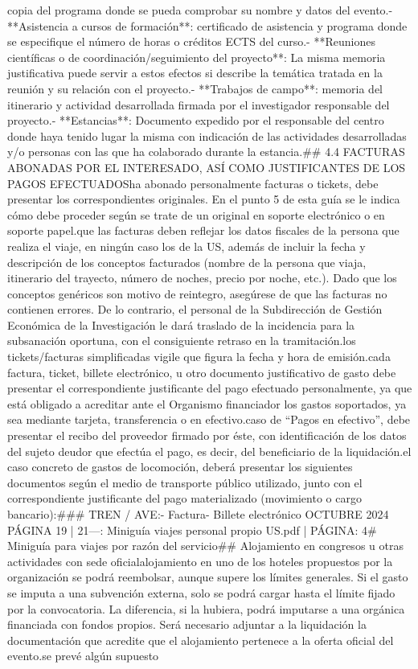 \documentclass{article}
\begin{document}
\begin{itemize}
copia del programa donde se pueda comprobar su nombre y datos del evento.\n- **Asistencia a cursos de formación**: certificado de asistencia y programa donde se especifique el número de horas o créditos ECTS del curso.\n- **Reuniones científicas o de coordinación/seguimiento del proyecto**: La misma memoria justificativa puede servir a estos efectos si describe la temática tratada en la reunión y su relación con el proyecto.\n- **Trabajos de campo**: memoria del itinerario y actividad desarrollada firmada por el investigador responsable del proyecto.\n- **Estancias**: Documento expedido por el responsable del centro donde haya tenido lugar la misma con indicación de las actividades desarrolladas y/o personas con las que ha colaborado durante la estancia.\n\n## 4.4 FACTURAS ABONADAS POR EL INTERESADO, ASÍ COMO JUSTIFICANTES DE LOS PAGOS EFECTUADOS\n\nSi ha abonado personalmente facturas o tickets, debe presentar los correspondientes originales. En el punto 5 de esta guía se le indica cómo debe proceder según se trate de un original en soporte electrónico o en soporte papel.\n\nRecuerde que las facturas deben reflejar los datos fiscales de la persona que realiza el viaje, en ningún caso los de la US, además de incluir la fecha y descripción de los conceptos facturados (nombre de la persona que viaja, itinerario del trayecto, número de noches, precio por noche, etc.). Dado que los conceptos genéricos son motivo de reintegro, asegúrese de que las facturas no contienen errores. De lo contrario, el personal de la Subdirección de Gestión Económica de la Investigación le dará traslado de la incidencia para la subsanación oportuna, con el consiguiente retraso en la tramitación.\n\nEn los tickets/facturas simplificadas vigile que figura la fecha y hora de emisión.\n\nPor cada factura, ticket, billete electrónico, u otro documento justificativo de gasto debe presentar el correspondiente justificante del pago efectuado personalmente, ya que está obligado a acreditar ante el Organismo financiador los gastos soportados, ya sea mediante tarjeta, transferencia o en efectivo.\n\nEn caso de “Pagos en efectivo”, debe presentar el recibo del proveedor firmado por éste, con identificación de los datos del sujeto deudor que efectúa el pago, es decir, del beneficiario de la liquidación.\n\nEn el caso concreto de gastos de locomoción, deberá presentar los siguientes documentos según el medio de transporte público utilizado, junto con el correspondiente justificante del pago materializado (movimiento o cargo bancario):\n\n### TREN / AVE:\n\n- Factura\n- Billete electrónico\n{} OCTUBRE 2024    PÁGINA 19 | 21\n\n---\n\nFUENTE: Miniguía viajes personal propio US.pdf | PÁGINA: 4\n# Miniguía para viajes por razón del servicio\n\n## Alojamiento en congresos u otras actividades con sede oficial\n\nEl alojamiento en uno de los hoteles propuestos por la organización se podrá reembolsar, aunque supere los límites generales. Si el gasto se imputa a una subvención externa, solo se podrá cargar hasta el límite fijado por la convocatoria. La diferencia, si la hubiera, podrá imputarse a una orgánica financiada con fondos propios. Será necesario adjuntar a la liquidación la documentación que acredite que el alojamiento pertenece a la oferta oficial del evento.\n\nSi se prevé algún supuesto 
\end{itemize}
\end{document}
